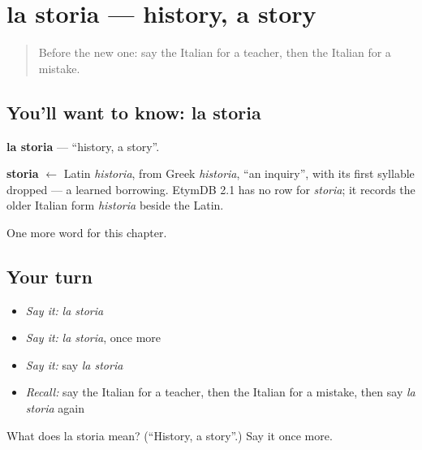 \section[la storia]{la storia — history, a story}

\label{lesson:IT-C259-storia}



\begin{quote}
Before the new one: say the Italian for a teacher, then the Italian for a mistake.
\end{quote}

\subsection*{You'll want to know: la storia}
\textbf{la storia} — \textquotedblleft{}history, a story\textquotedblright{}.

\begin{cousinweb}
\textbf{storia} $\leftarrow$ Latin \emph{historia}, from Greek \emph{historia}, \textquotedblleft{}an inquiry\textquotedblright{}, with its first syllable dropped — a learned borrowing. EtymDB 2.1 has no row for \emph{storia}; it records the older Italian form \emph{historia} beside the Latin.
\end{cousinweb}

\begin{grammarlens}[title={What you've built}]
One more word for this chapter.
\end{grammarlens}

\subsection*{Your turn}
\begin{itemize}
\raggedright
  \item \emph{Say it:} \emph{la storia}
  \item \emph{Say it:} \emph{la storia}, once more
  \item \emph{Say it:} say \emph{la storia}
  \item \emph{Recall:} say the Italian for a teacher, then the Italian for a mistake, then say \emph{la storia} again
\end{itemize}

\begin{tcolorbox}[breakable,colback=teal!4,colframe=teal!35!black,title={Before you move on}]
What does la storia mean? (\textquotedblleft{}History, a story\textquotedblright{}.) Say it once more.
\end{tcolorbox}
